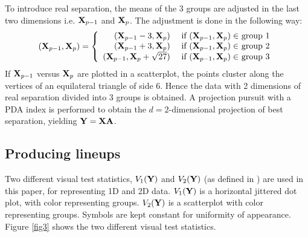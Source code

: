 To introduce real separation, the means of the 3 groups are adjusted in the last two dimensions i.e. $ {\mbox{\boldmath {\bf X}}}_{p-1}$ and ${\mbox{\boldmath {\bf X}}}_p$. The adjustment is done in the following way:
$$
( {\mbox{\boldmath {\bf X}}}_{p-1},  {\mbox{\boldmath {\bf X}}}_p) = \left\{ \begin{array}{rl}
 ( {\mbox{\boldmath {\bf X}}}_{p-1} - 3,  {\mbox{\boldmath {\bf X}}}_p) &\mbox{ if $( {\mbox{\boldmath {\bf X}}}_{p-1},  {\mbox{\boldmath {\bf X}}}_p) \in$ group 1} \\
 ( {\mbox{\boldmath {\bf X}}}_{p-1} + 3,  {\mbox{\boldmath {\bf X}}}_p) &\mbox{ if $({\mbox{\boldmath {\bf X}}}_{p-1},  {\mbox{\boldmath {\bf X}}}_p) \in$ group 2} \\
 ( {\mbox{\boldmath {\bf X}}}_{p-1} ,  {\mbox{\boldmath {\bf X}}}_p + \sqrt{27}) &\mbox{ if $( {\mbox{\boldmath {\bf X}}}_{p-1},  {\mbox{\boldmath {\bf X}}}_p) \in$ group 3}
       \end{array} \right.
$$
If $ {\mbox{\boldmath {\bf X}}}_{p-1}$ versus ${\mbox{\boldmath {\bf X}}}_p$ are plotted in a scatterplot, the points cluster along the vertices of an equilateral triangle of side 6. Hence the data with 2 dimensions of real separation divided into 3 groups is obtained. A projection pursuit with a PDA index is performed to obtain the $d = 2$-dimensional projection of best separation, yielding ${\mbox{\boldmath {\bf Y}}} = {\mbox{\boldmath {\bf X}}}{\mbox{\boldmath {\bf A}}}$. 

\subsection{Producing lineups}

Two different visual test statistics, $V_1({\mbox{\boldmath {\bf Y}}})$ and $V_2({\mbox{\boldmath {\bf Y}}})$ (as defined in \cite{majumder:2011}) are used in this paper, for representing 1D and 2D data. $V_1({\mbox{\boldmath {\bf Y}}})$ is a horizontal jittered dot plot, with color representing groups. $V_2({\mbox{\boldmath {\bf Y}}})$ is a scatterplot with color representing groups. Symbols are kept constant for uniformity of appearance. Figure \ref{fig3} shows the two different visual test statistics.


